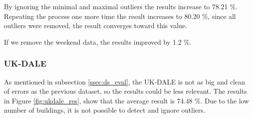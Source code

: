 By ignoring the minimal and maximal outliers the results increase to 78.21 \%.
Repeating the process one more time the result increases to 80.20 \%, since all outliers were removed, the result converges toward this value. 

If we remove the weekend data, the results improved by 1.2 \%. 

\subsubsection{UK-DALE}

As mentioned in subsection \ref{ssec:ds_eval}, the UK-DALE is not as big and clean of errors as the previous dataset, so the results could be less relevant.
The results in Figure \ref{fig:ukdale_res}, show that the average result is 74.48 \%. 
Due to the low number of buildings, it is not possible to detect and ignore outliers.

